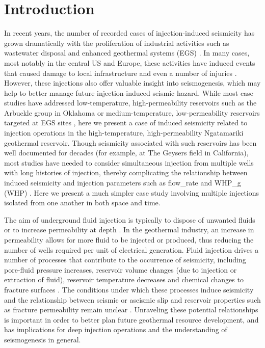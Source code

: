 \section{Introduction} \label{Intro}
In recent years, the number of recorded cases of injection-induced seismicity has grown dramatically with the proliferation of industrial activities such as wastewater disposal and enhanced geothermal systems (EGS) \citep{Ellsworth_2013}. In many cases, most notably in the central US and Europe, these activities have induced events that caused damage to local infrastructure and even a number of injuries \citep[e.g.][]{Keranen_2013,Hsieh_1981,Deichmann_2009}. However, these injections also offer valuable insight into seismogenesis, which may help to better manage future injection-induced seismic hazard. While most case studies have addressed low-temperature, high-permeability reservoirs such as the Arbuckle group in Oklahoma \citep[e.g.][]{Langenbruch_2016} or medium-temperature, low-permeability reservoirs targeted at EGS sites \citep[e.g.][]{Deichmann_2009,Evans_2005}, here we present a case of induced seismicity related to injection operations in the high-temperature, high-permeability Ngatamariki geothermal reservoir. Though seismicity associated with such reservoirs has been well documented for decades (for example, at The Geysers field in California), most studies have needed to consider simultaneous injection from multiple wells with long histories of injection, thereby complicating the relationship between induced seismicity and injection parameters such as \gls{flow_rate} and \gls{WHP_g} (\acrshort{WHP}) \citep[e.g.][]{Allis_1982,Mart_nez_Garz_n_2014, Kwiatek_2015,Mart_nez_Garz_n_2017}. Here we present a much simpler case study involving multiple injections isolated from one another in both space and time.

The aim of underground fluid injection is typically to dispose of unwanted fluids or to increase \gls{permeability} at depth \citep{Ellsworth_2013,Grant_2011}. In the geothermal industry, an increase in \gls{permeability} allows for more fluid to be injected or produced, thus reducing the number of wells required per unit of electrical generation. Fluid injection drives a number of processes that contribute to the occurrence of seismicity, including pore-fluid pressure increases, reservoir volume changes (due to injection or extraction of fluid), reservoir temperature decreases and chemical changes to fracture surfaces \citep{Majer_2007}. The conditions under which these processes induce seismicity and the relationship between seismic or aseismic slip and reservoir properties such as fracture \gls{permeability} remain unclear \citep[][and references therein]{Amann_2018,Das_2011}. Unraveling these potential relationships is important in order to better plan future geothermal resource development, and has implications for deep injection operations and the understanding of seismogenesis in general.

